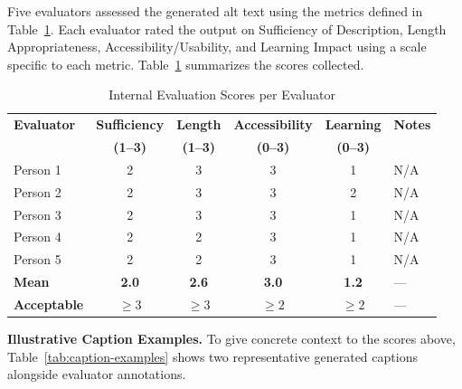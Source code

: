 \documentclass[12pt, titlepage]{article}
\begin{document}
Five evaluators assessed the generated alt text using the metrics defined in Table~\ref{tab:internal_results}. Each evaluator rated the output on Sufficiency of Description, Length Appropriateness, Accessibility/Usability, and Learning Impact using a scale specific to each metric. Table~\ref{tab:internal_results} summarizes the scores collected.

\begin{table}[h]
\centering
\caption{Internal Evaluation Scores per Evaluator}
\label{tab:internal_results}
\small
\begin{tabularx}{0.96\textwidth}{|l|c|c|c|c|X|}
\hline
\textbf{Evaluator} & \textbf{Sufficiency} & \textbf{Length} & \textbf{Accessibility} & \textbf{Learning} & \textbf{Notes} \\
 & \textbf{(1--3)} & \textbf{(1--3)} & \textbf{(0--3)} & \textbf{(0--3)} & \\
\hline
Person 1 & 2 & 3 & 3 & 1 & N/A \\
Person 2 & 2 & 3 & 3 & 2 & N/A \\
Person 3 & 2 & 3 & 3 & 1 & N/A \\
Person 4 & 2 & 2 & 3 & 1 & N/A \\
Person 5 & 2 & 2 & 3 & 1 & N/A \\
\hline
\textbf{Mean}  & \textbf{2.0} & \textbf{2.6} & \textbf{3.0} & \textbf{1.2} & --- \\
\hline
\textbf{Acceptable} & $\geq 3$ & $\geq 3$ & $\geq 2$ & $\geq 2$ & --- \\
\hline
\end{tabularx}
\end{table}

\noindent\textbf{Illustrative Caption Examples.} To give concrete context to the scores above, Table~\ref{tab:caption-examples} shows two representative generated captions alongside evaluator annotations.
\end{document}
